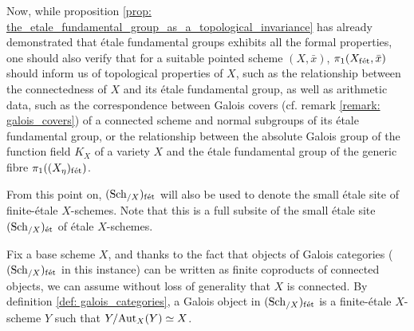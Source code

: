         Now, while proposition \ref{prop: the_etale_fundamental_group_as_a_topological_invariance} has already demonstrated that \'etale fundamental groups exhibits all the  formal properties, one should also verify that for a suitable pointed scheme $(X, \bar{x})$, $\pi_1(X_{\mathrm{f\acute{e}t}}, \bar{x})$ should inform us of topological properties of $X$, such as the relationship between the connectedness of $X$ and its \'etale fundamental group, as well as arithmetic data, such as the correspondence between Galois covers (cf. remark \ref{remark: galois_covers}) of a connected scheme and normal subgroups of its \'etale fundamental group, or the relationship between the absolute Galois group of the function field $K_X$ of a variety $X$ and the \'etale fundamental group of the generic fibre $\pi_1((X_{\eta})_{\mathrm{f\acute{e}t}})$.
        \begin{convention}
            From this point on, $(\mathrm{Sch}_{/X})_{\mathrm{f\acute{e}t}}$ will also be used to denote the small \'etale site of finite-\'etale $X$-schemes. Note that this is a full subsite of the small \'etale site $(\mathrm{Sch}_{/X})_{\mathrm{\acute{e}t}}$ of \'etale $X$-schemes. 
        \end{convention}
        \begin{remark} \label{remark: galois_covers}
            Fix a base scheme $X$, and thanks to the fact that objects of Galois categories ($(\mathrm{Sch}_{/X})_{\mathrm{f\acute{e}t}}$ in this instance) can be written as finite coproducts of connected objects, we can assume without loss of generality that $X$ is connected. By definition \ref{def: galois_categories}, a Galois object in $(\mathrm{Sch}_{/X})_{\mathrm{f\acute{e}t}}$ is a finite-\'etale $X$-scheme $Y$ such that $Y/\mathrm{Aut}_X(Y) \simeq X$.
        \end{remark}
        

